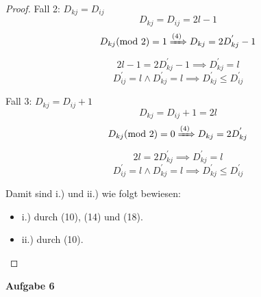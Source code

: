 \documentclass{article}
\begin{document}
\begin{proof}
\noindent
Fall 2: $D_{kj} = D_{ij}$
\begin{equation}
  D_{kj} = D_{ij}=2l-1
\end{equation}
\begin{equation}
  D_{kj}(\text{mod } 2) = 1 \xRightarrow{(4)} D_{kj} = 2D^{'}_{kj} - 1
\end{equation}
\begin{equation}
  2l - 1 = 2D^{'}_{kj} - 1 \implies D^{'}_{kj} = l
\end{equation}
\begin{equation}
  D^{'}_{ij} = l \wedge D^{'}_{kj} = l \implies D^{'}_{kj} \leq D^{'}_{ij}
\end{equation}

\noindent
Fall 3: $D_{kj} = D_{ij} + 1$
\begin{equation}
  D_{kj} = D_{ij} + 1 = 2l
\end{equation}
\begin{equation}
  D_{kj}(\text{mod } 2) = 0 \xRightarrow{(4)} D_{kj} = 2D^{'}_{kj}
\end{equation}
\begin{equation}
  2l = 2D^{'}_{kj} \implies D^{'}_{kj} = l
\end{equation}
\begin{equation}
  D^{'}_{ij} = l \wedge D^{'}_{kj} = l \implies D^{'}_{kj} \leq D^{'}_{ij}
\end{equation}

\noindent
Damit sind i.) und ii.) wie folgt bewiesen:
\begin{itemize}
  \item[] i.) durch (10), (14) und (18).
  \item[] ii.) durch (10).
\end{itemize}
\end{proof}

\newpage
{\noindent\bfseries Aufgabe 6}%
\medskip%
\end{document}
